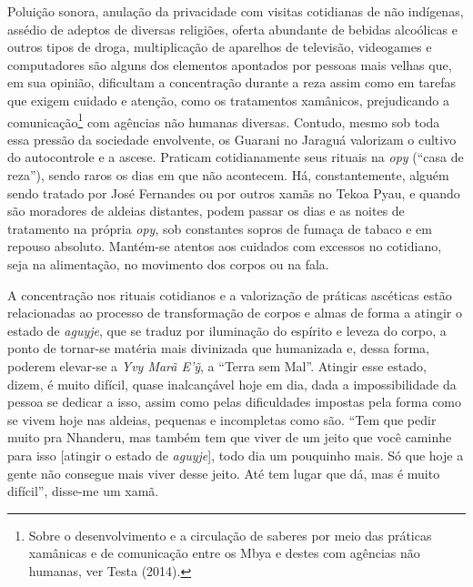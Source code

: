 Poluição sonora, anulação da privacidade com visitas cotidianas de não
indígenas, assédio de adeptos de diversas religiões, oferta abundante de
bebidas alcoólicas e outros tipos de droga, multiplicação de aparelhos
de televisão, videogames e computadores são alguns dos elementos
apontados por pessoas mais velhas que, em sua opinião, dificultam a
concentração durante a reza assim como em tarefas que exigem cuidado e
atenção, como os tratamentos xamânicos, prejudicando a
comunicação\footnote{Sobre o desenvolvimento e a circulação de saberes
  por meio das práticas xamânicas e de comunicação entre os Mbya e
  destes com agências não humanas, ver Testa (2014).} com agências não
humanas diversas. Contudo, mesmo sob toda essa pressão da sociedade
envolvente, os Guarani no Jaraguá valorizam o cultivo do autocontrole e
a ascese. Praticam cotidianamente seus rituais na \emph{opy} (``casa de
reza''), sendo raros os dias em que não acontecem. Há, constantemente,
alguém sendo tratado por José Fernandes ou por outros xamãs no Tekoa
Pyau, e quando são moradores de aldeias distantes, podem passar os dias
e as noites de tratamento na própria \emph{opy}, sob constantes sopros
de fumaça de tabaco e em repouso absoluto. Mantém-se atentos aos
cuidados com excessos no cotidiano, seja na alimentação, no movimento
dos corpos ou na fala.

A concentração nos rituais cotidianos e a valorização de práticas
ascéticas estão relacionadas ao processo de transformação de corpos e
almas de forma a atingir o estado de \emph{aguyje}, que se traduz por
iluminação do espírito e leveza do corpo, a ponto de tornar-se matéria
mais divinizada que humanizada e, dessa forma, poderem elevar-se a
\emph{Yvy Marã E'ỹ}, a ``Terra sem Mal''. Atingir esse estado, dizem, é
muito difícil, quase inalcançável hoje em dia, dada a impossibilidade da
pessoa se dedicar a isso, assim como pelas dificuldades impostas pela
forma como se vivem hoje nas aldeias, pequenas e incompletas como são.
``Tem que pedir muito pra Nhanderu, mas também tem que viver de um jeito
que você caminhe para isso {[}atingir o estado de \emph{aguyje}{]}, todo
dia um pouquinho mais. Só que hoje a gente não consegue mais viver desse
jeito. Até tem lugar que dá, mas é muito difícil'', disse-me um xamã.

